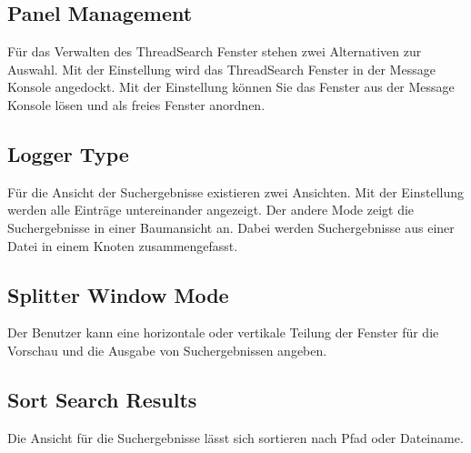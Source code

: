 \subsection{Panel Management}

Für das Verwalten des ThreadSearch Fenster stehen zwei Alternativen zur Auswahl. Mit der Einstellung  wird das ThreadSearch Fenster in der Message Konsole angedockt. Mit der Einstellung  können Sie das Fenster aus der Message Konsole lösen und als freies Fenster anordnen.

\subsection{Logger Type}

Für die Ansicht der Suchergebnisse existieren zwei Ansichten. Mit der Einstellung  werden alle Einträge untereinander angezeigt. Der andere Mode  zeigt die Suchergebnisse in einer Baumansicht an. Dabei werden Suchergebnisse aus einer Datei in einem Knoten zusammengefasst.

\subsection{Splitter Window Mode}

Der Benutzer kann eine horizontale oder vertikale Teilung der Fenster für die Vorschau und die Ausgabe von Suchergebnissen angeben.

\subsection{Sort Search Results}

Die Ansicht für die Suchergebnisse lässt sich sortieren nach Pfad oder Dateiname.
